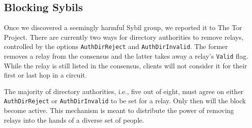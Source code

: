 \subsection{Blocking Sybils}
\label{sec:blocking-sybils}
Once we discovered a seemingly harmful Sybil group, we reported it to The Tor
Project.  There are currently two ways for directory authorities to remove
relays, controlled by the options \texttt{AuthDirReject} and
\texttt{AuthDirInvalid}.  The former removes a relay from the consensus and the
latter takes away a relay's \texttt{Valid} flag.  While the relay is still
listed in the consensus, clients will not consider it for their first or last
hop in a circuit.

The majority of directory authorities, i.e., five out of eight, must agree on
either \texttt{AuthDirReject} or \texttt{AuthDirInvalid} to be set for a relay.
Only then will the block become active.  This mechanism is meant to distribute
the power of removing relays into the hands of a diverse set of people.
